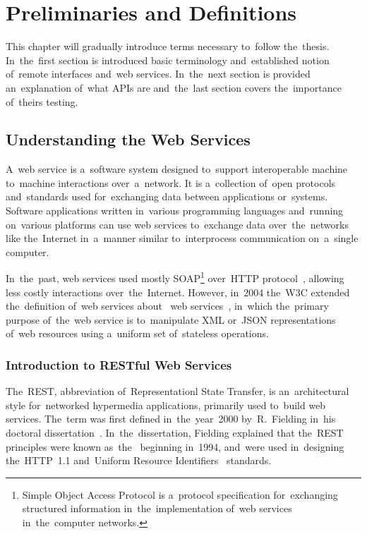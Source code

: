 \chapter{Preliminaries and Definitions}
\label{Preliminaries}
This chapter will gradually introduce terms necessary to~follow the~thesis.
In~the~first section is introduced basic terminology and~established notion
of~remote interfaces and~web services. In~the~next section is provided
an~explanation of~what APIs are and~the~last section covers the~importance
of~theirs testing.



\section{Understanding the Web Services}
\label{WebServices}
A~web service is a~software system designed to~support interoperable machine
to~machine interactions over~a~network. It is a~collection of~open protocols
and~standards used for~exchanging data between applications or~systems. Software
applications written in~various programming languages and~running on~various
platforms can use web services to~exchange data over~the~networks like
the~Internet in~a~manner similar to~interprocess communication on~a~single
computer.

In~the~past, web services used mostly SOAP\footnote{Simple Object Access
Protocol is a~protocol specification for~exchanging structured information
in~the~implementation of~web services in~the~computer networks.} over~HTTP
protocol~\cite{HTTP}, allowing less costly interactions over~the~Internet.
However, in~2004 the~W3C extended the~definition of~web services
about~ web services~\cite{W3CWebServices}, in~which
the~primary purpose of~the~web service is to~manipulate XML or~JSON
representations of~web resources using a~uniform set of~stateless operations.



\subsection{Introduction to RESTful Web Services}
The~REST, abbreviation of~Representationl State Transfer, is an~architectural
style for~networked hypermedia applications, primarily used to~build web
services. The~term was first defined in~the~year~2000 by~R.~Fielding in~his
doctoral dissertation~\cite{FieldingDissertation}. In~the~dissertation, Fielding
explained that the~REST principles were known as~the~
beginning in~1994, and~were used in~designing the~HTTP~1.1 and~Uniform Resource
Identifiers~\cite{URI-RFC} standards.

